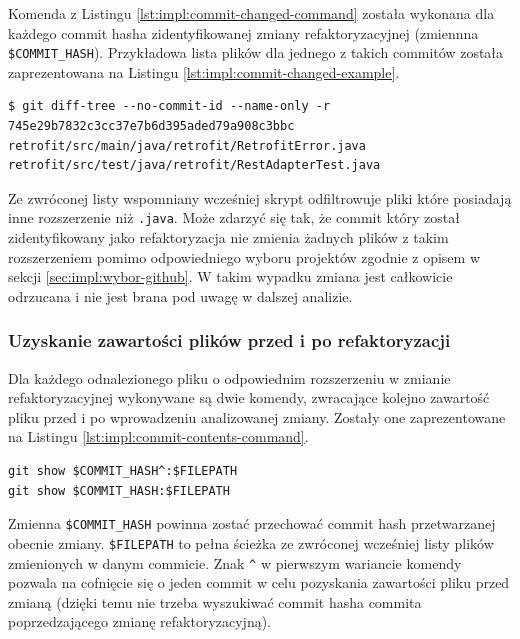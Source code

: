 \documentclass[12pt]{report}
\begin{document}
Komenda z Listingu \ref{lst:impl:commit-changed-command} została wykonana dla każdego commit hasha zidentyfikowanej zmiany refaktoryzacyjnej (zmiennna \texttt{\$COMMIT\_HASH}). Przykładowa lista plików dla jednego z takich commitów została zaprezentowana na Listingu \ref{lst:impl:commit-changed-example}.

\begin{lstlisting}[frame=single,caption={Przykładowy wynik komendy prezentującej listę zmienionych plików w zadanym commicie},captionpos=b,label={lst:impl:commit-changed-example}]
$ git diff-tree --no-commit-id --name-only -r 745e29b7832c3cc37e7b6d395aded79a908c3bbc
retrofit/src/main/java/retrofit/RetrofitError.java
retrofit/src/test/java/retrofit/RestAdapterTest.java
\end{lstlisting}

Ze zwróconej listy wspomniany wcześniej skrypt odfiltrowuje pliki które posiadają inne rozszerzenie niż \texttt{.java}. Może zdarzyć się tak, że commit który został zidentyfikowany jako refaktoryzacja nie zmienia żadnych plików z takim rozszerzeniem pomimo odpowiedniego wyboru projektów zgodnie z opisem w sekcji \ref{sec:impl:wybor-github}. W takim wypadku zmiana jest całkowicie odrzucana i nie jest brana pod uwagę w dalszej analizie.

\subsubsection{Uzyskanie zawartości plików przed i po refaktoryzacji}
Dla każdego odnalezionego pliku o odpowiednim rozszerzeniu w zmianie refaktoryzacyjnej wykonywane są dwie komendy, zwracające kolejno zawartość pliku przed i po wprowadzeniu analizowanej zmiany. Zostały one zaprezentowane na Listingu \ref{lst:impl:commit-contents-command}.

\begin{lstlisting}[frame=single,caption={Komendy pozwalające na otrzymanie zawartości pliku przed i po wykonaniu danej zmiany},captionpos=b,label={lst:impl:commit-contents-command}]
git show $COMMIT_HASH^:$FILEPATH
git show $COMMIT_HASH:$FILEPATH
\end{lstlisting}

Zmienna \texttt{\$COMMIT\_HASH} powinna zostać przechować commit hash przetwarzanej obecnie zmiany. \texttt{\$FILEPATH} to pełna ścieżka ze zwróconej wcześniej listy plików zmienionych w danym commicie. Znak \texttt{\^} w pierwszym wariancie komendy pozwala na cofnięcie się o jeden commit w celu pozyskania zawartości pliku przed zmianą (dzięki temu nie trzeba wyszukiwać commit hasha commita poprzedzającego zmianę refaktoryzacyjną).
\end{document}
